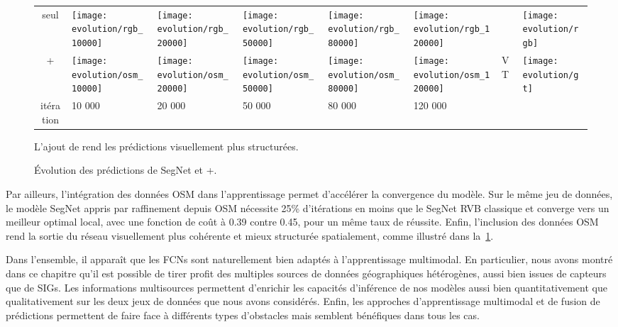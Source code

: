 \begin{figure}
\centering
\begin{tabularx}{0.95\textwidth}{c Y Y Y Y Y Y Y}
 seul &
\texttt{[image: evolution/rgb\_10000]} &
\texttt{[image: evolution/rgb\_20000]} &
\texttt{[image: evolution/rgb\_50000]} &
\texttt{[image: evolution/rgb\_80000]} &
\texttt{[image: evolution/rgb\_120000]} &
 &
\texttt{[image: evolution/rgb]} \\
 +  &
\texttt{[image: evolution/osm\_10000]} &
\texttt{[image: evolution/osm\_20000]} &
\texttt{[image: evolution/osm\_50000]} &
\texttt{[image: evolution/osm\_80000]} &
\texttt{[image: evolution/osm\_120000]} &
VT &
\texttt{[image: evolution/gt]} \\
itération & 10 000 & 20 000 & 50 000 & 80 000 & 120 000\\
\end{tabularx}
\caption{Évolution des prédictions de SegNet  et +.}{L'ajout de  rend les prédictions visuellement plus structurées.\\\isprslegende}
\label{fig:training_evolution}
\end{figure}

Par ailleurs, l'intégration des données \gls{OSM} dans l'apprentissage permet d'accélérer la convergence du modèle. Sur le même jeu de données, le modèle SegNet appris par raffinement depuis \gls{OSM} nécessite 25\% d'itérations en moins que le SegNet \gls{RVB} classique et converge vers un meilleur optimal local, avec une fonction de coût à \num{0,39} contre \num{0,45}, pour un même taux de réussite. Enfin, l'inclusion des données \gls{OSM} rend la sortie du réseau visuellement plus cohérente et mieux structurée spatialement, comme illustré dans la~\cref{fig:training_evolution}.

Dans l'ensemble, il apparaît que les \glspl{FCN} sont naturellement bien adaptés à l'apprentissage multimodal. En particulier, nous avons montré dans ce chapitre qu'il est possible de tirer profit des multiples sources de données géographiques hétérogènes, aussi bien issues de capteurs que de \glspl{SIG}. Les informations multisources permettent d'enrichir les capacités d'inférence de nos modèles aussi bien quantitativement que qualitativement sur les deux jeux de données que nous avons considérés. Enfin, les approches d'apprentissage multimodal et de fusion de prédictions permettent de faire face à différents types d'obstacles mais semblent bénéfiques dans tous les cas.


%
%
\printbibliography[heading=subbibliography]
